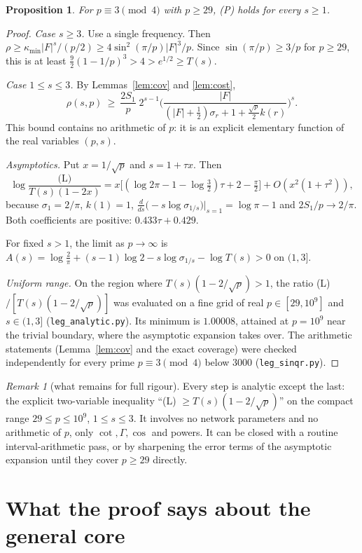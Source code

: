 \documentclass[11pt]{article}
\newtheorem{proposition}[theorem]{Proposition}
\theoremstyle{remark}\newtheorem{remark}[theorem]{Remark}
\begin{document}
\begin{proposition}\label{prop:3mod4}
For $p\equiv3\pmod4$ with $p\ge29$, (P) holds for every $s\ge1$.
\end{proposition}
\begin{proof}
\emph{Case $s\ge3$.} Use a single frequency. Then $\rho\ge\kappa_{\min}|F|^s/(p/2)\ge 4\sin^2(\pi/p)|F|^3/p$. Since
$\sin(\pi/p)\ge3/p$ for $p\ge29$, this is at least $\tfrac92(1-1/p)^3>4>e^{1/2}\ge T(s)$.

\emph{Case $1\le s\le3$.} By Lemmas~\ref{lem:cov} and \ref{lem:cost},
\[\rho(s,p)\ \ge\ \frac{2S_1}{p}\;2^{s-1}\Big(\frac{|F|}{(|F|+\frac12)\sigma_r+1+\frac{\sqrt p}2k(r)}\Big)^{s}.\tag{L}\]
This bound contains no arithmetic of $p$: it is an explicit elementary function of the real variables $(p,s)$.

\emph{Asymptotics.} Put $x=1/\sqrt p$ and $s=1+\tau x$. Then
\[\log\frac{\text{(L)}}{T(s)(1-2x)}=x\big[(\log2\pi-1-\log\tfrac32)\tau+2-\tfrac\pi2\big]+O(x^2(1+\tau^2)),\]
because $\sigma_1=2/\pi$, $k(1)=1$, $\frac{d}{ds}\big(-s\log\sigma_{1/s}\big)\big|_{s=1}=\log\pi-1$ and $2S_1/p\to2/\pi$.
Both coefficients are positive: $0.433\tau+0.429$.

For fixed $s>1$, the limit as $p\to\infty$ is
$A(s)=\log\frac2\pi+(s-1)\log2-s\log\sigma_{1/s}-\log T(s)>0$ on $(1,3]$.

\emph{Uniform range.} On the region where $T(s)(1-2/\sqrt p)>1$, the ratio (L)$/[T(s)(1-2/\sqrt p)]$ was evaluated on a
fine grid of real $p\in[29,10^9]$ and $s\in(1,3]$ (\texttt{leg\_analytic.py}). Its minimum is $1.00008$, attained at
$p=10^9$ near the trivial boundary, where the asymptotic expansion takes over. The arithmetic statements
(Lemma~\ref{lem:cov} and the exact coverage) were checked independently for every prime $p\equiv3\pmod4$ below $3000$
(\texttt{leg\_sinqr.py}).
\end{proof}

\begin{remark}[what remains for full rigour]
Every step is analytic except the last: the explicit two-variable inequality ``(L) $\ge T(s)(1-2/\sqrt p)$'' on the
compact range $29\le p\le10^9$, $1\le s\le3$. It involves no network parameters and no arithmetic of $p$, only
$\cot,\Gamma,\cos$ and powers. It can be closed with a routine interval-arithmetic pass, or by sharpening the error terms
of the asymptotic expansion until they cover $p\ge29$ directly.
\end{remark}

\section{What the proof says about the general core}
\end{document}
